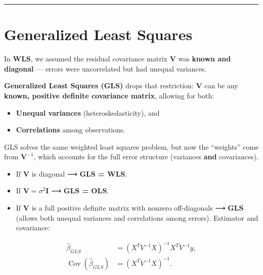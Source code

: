 \documentclass[
  letterpaper,
  DIV=11,
  numbers=noendperiod]{scrreprt}
\providecommand{\tightlist}{%
  \setlength{\itemsep}{0pt}\setlength{\parskip}{0pt}}\usepackage{longtable,booktabs,array}
\begin{document}
\begin{center}\rule{0.5\linewidth}{0.5pt}\end{center}

\hypertarget{generalized-least-squares}{%
\section*{Generalized Least Squares}\label{generalized-least-squares}}


In \textbf{WLS}, we assumed the residual covariance matrix
\(\mathbf{V}\) was \textbf{known and diagonal} --- errors were
uncorrelated but had unequal variances.

\textbf{Generalized Least Squares (GLS)} drops that restriction:
\(\mathbf{V}\) can be any \textbf{known, positive definite covariance
matrix}, allowing for both:

\begin{itemize}
\tightlist
\item
  \textbf{Unequal variances} (heteroskedasticity), and\\
\item
  \textbf{Correlations} among observations.
\end{itemize}

GLS solves the same weighted least squares problem, but now the
``weights'' come from \(\mathbf{V}^{-1}\), which accounts for the full
error structure (variances \textbf{and} covariances).

\begin{itemize}
\tightlist
\item
  If \(\mathbf{V}\) is diagonal ⟶ \textbf{GLS = WLS}.\\
\item
  If \(\mathbf{V} = \sigma^2 \mathbf{I}\) ⟶ \textbf{GLS = OLS}.\\
\item
  If \(\mathbf{V}\) is a full positive definite matrix with nonzero
  off-diagonals ⟶ \textbf{GLS} (allows both unequal variances and
  correlations among errors). Estimator and covariance:
\end{itemize}

\[
\begin{align*}
\hat{\beta}_{GLS} &= (X^T V^{-1} X)^{-1} X^T V^{-1} y, \\
\operatorname{Cov}(\hat{\beta}_{GLS}) &= (X^T V^{-1} X)^{-1}.
\end{align*}
\]
\end{document}
